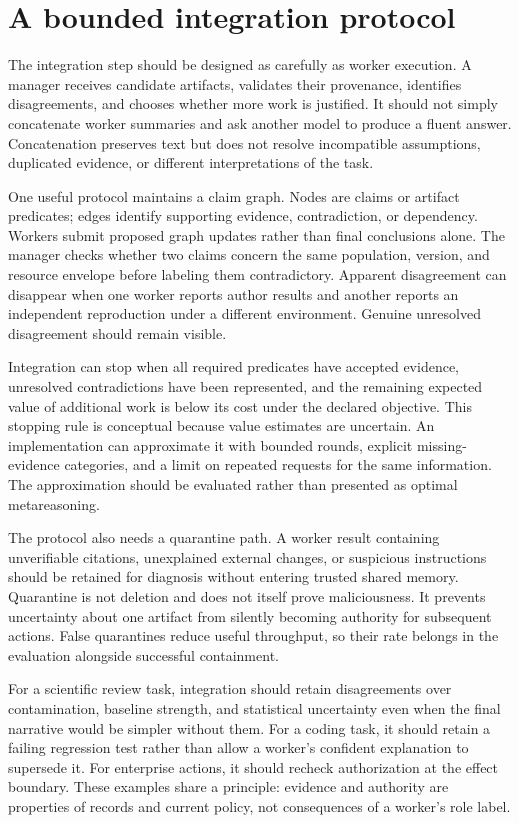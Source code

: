 \section{A bounded integration protocol}\label{sec:C21:integration}
The integration step should be designed as carefully as worker execution. A manager receives candidate artifacts, validates their provenance, identifies disagreements, and chooses whether more work is justified. It should not simply concatenate worker summaries and ask another model to produce a fluent answer. Concatenation preserves text but does not resolve incompatible assumptions, duplicated evidence, or different interpretations of the task.

One useful protocol maintains a claim graph. Nodes are claims or artifact predicates; edges identify supporting evidence, contradiction, or dependency. Workers submit proposed graph updates rather than final conclusions alone. The manager checks whether two claims concern the same population, version, and resource envelope before labeling them contradictory. Apparent disagreement can disappear when one worker reports author results and another reports an independent reproduction under a different environment. Genuine unresolved disagreement should remain visible.

Integration can stop when all required predicates have accepted evidence, unresolved contradictions have been represented, and the remaining expected value of additional work is below its cost under the declared objective. This stopping rule is conceptual because value estimates are uncertain. An implementation can approximate it with bounded rounds, explicit missing-evidence categories, and a limit on repeated requests for the same information. The approximation should be evaluated rather than presented as optimal metareasoning.

The protocol also needs a quarantine path. A worker result containing unverifiable citations, unexplained external changes, or suspicious instructions should be retained for diagnosis without entering trusted shared memory. Quarantine is not deletion and does not itself prove maliciousness. It prevents uncertainty about one artifact from silently becoming authority for subsequent actions. False quarantines reduce useful throughput, so their rate belongs in the evaluation alongside successful containment.

For a scientific review task, integration should retain disagreements over contamination, baseline strength, and statistical uncertainty even when the final narrative would be simpler without them. For a coding task, it should retain a failing regression test rather than allow a worker's confident explanation to supersede it. For enterprise actions, it should recheck authorization at the effect boundary. These examples share a principle: evidence and authority are properties of records and current policy, not consequences of a worker's role label.

